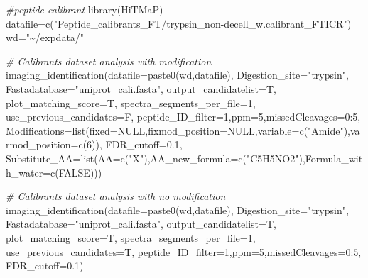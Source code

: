\documentclass[
]{article}
\newenvironment{Shaded}{\begin{snugshade}}{\end{snugshade}}
\newcommand{\AttributeTok}[1]{\textcolor[rgb]{0.77,0.63,0.00}{#1}}
\newcommand{\CommentTok}[1]{\textcolor[rgb]{0.56,0.35,0.01}{\textit{#1}}}
\newcommand{\ConstantTok}[1]{\textcolor[rgb]{0.00,0.00,0.00}{#1}}
\newcommand{\DecValTok}[1]{\textcolor[rgb]{0.00,0.00,0.81}{#1}}
\newcommand{\FloatTok}[1]{\textcolor[rgb]{0.00,0.00,0.81}{#1}}
\newcommand{\FunctionTok}[1]{\textcolor[rgb]{0.00,0.00,0.00}{#1}}
\newcommand{\NormalTok}[1]{#1}
\newcommand{\OtherTok}[1]{\textcolor[rgb]{0.56,0.35,0.01}{#1}}
\newcommand{\SpecialCharTok}[1]{\textcolor[rgb]{0.00,0.00,0.00}{#1}}
\newcommand{\StringTok}[1]{\textcolor[rgb]{0.31,0.60,0.02}{#1}}
\begin{document}
\begin{Shaded}
\begin{Highlighting}[]
\CommentTok{\#peptide calibrant}
\FunctionTok{library}\NormalTok{(HiTMaP)}
\NormalTok{datafile}\OtherTok{=}\FunctionTok{c}\NormalTok{(}\StringTok{"Peptide\_calibrants\_FT/trypsin\_non{-}decell\_w.calibrant\_FTICR"}\NormalTok{)}
\NormalTok{wd}\OtherTok{=}\StringTok{"\textasciitilde{}/expdata/"}

\CommentTok{\# Calibrants dataset analysis with modification}
\FunctionTok{imaging\_identification}\NormalTok{(}\AttributeTok{datafile=}\FunctionTok{paste0}\NormalTok{(wd,datafile),}
  \AttributeTok{Digestion\_site=}\StringTok{"trypsin"}\NormalTok{,}
  \AttributeTok{Fastadatabase=}\StringTok{"uniprot\_cali.fasta"}\NormalTok{,}
  \AttributeTok{output\_candidatelist=}\NormalTok{T,}
  \AttributeTok{plot\_matching\_score=}\NormalTok{T,}
  \AttributeTok{spectra\_segments\_per\_file=}\DecValTok{1}\NormalTok{,}
  \AttributeTok{use\_previous\_candidates=}\NormalTok{F,}
  \AttributeTok{peptide\_ID\_filter=}\DecValTok{1}\NormalTok{,}\AttributeTok{ppm=}\DecValTok{5}\NormalTok{,}\AttributeTok{missedCleavages=}\DecValTok{0}\SpecialCharTok{:}\DecValTok{5}\NormalTok{,}
  \AttributeTok{Modifications=}\FunctionTok{list}\NormalTok{(}\AttributeTok{fixed=}\ConstantTok{NULL}\NormalTok{,}\AttributeTok{fixmod\_position=}\ConstantTok{NULL}\NormalTok{,}\AttributeTok{variable=}\FunctionTok{c}\NormalTok{(}\StringTok{"Amide"}\NormalTok{),}\AttributeTok{varmod\_position=}\FunctionTok{c}\NormalTok{(}\DecValTok{6}\NormalTok{)),}
  \AttributeTok{FDR\_cutoff=}\FloatTok{0.1}\NormalTok{,}
  \AttributeTok{Substitute\_AA=}\FunctionTok{list}\NormalTok{(}\AttributeTok{AA=}\FunctionTok{c}\NormalTok{(}\StringTok{"X"}\NormalTok{),}\AttributeTok{AA\_new\_formula=}\FunctionTok{c}\NormalTok{(}\StringTok{"C5H5NO2"}\NormalTok{),}\AttributeTok{Formula\_with\_water=}\FunctionTok{c}\NormalTok{(}\ConstantTok{FALSE}\NormalTok{)))}

\CommentTok{\# Calibrants dataset analysis with no modification}
\FunctionTok{imaging\_identification}\NormalTok{(}\AttributeTok{datafile=}\FunctionTok{paste0}\NormalTok{(wd,datafile),}
  \AttributeTok{Digestion\_site=}\StringTok{"trypsin"}\NormalTok{,}
  \AttributeTok{Fastadatabase=}\StringTok{"uniprot\_cali.fasta"}\NormalTok{,}
  \AttributeTok{output\_candidatelist=}\NormalTok{T,}
  \AttributeTok{plot\_matching\_score=}\NormalTok{T,}
  \AttributeTok{spectra\_segments\_per\_file=}\DecValTok{1}\NormalTok{,}
  \AttributeTok{use\_previous\_candidates=}\NormalTok{T,}
  \AttributeTok{peptide\_ID\_filter=}\DecValTok{1}\NormalTok{,}\AttributeTok{ppm=}\DecValTok{5}\NormalTok{,}\AttributeTok{missedCleavages=}\DecValTok{0}\SpecialCharTok{:}\DecValTok{5}\NormalTok{,}
  \AttributeTok{FDR\_cutoff=}\FloatTok{0.1}\NormalTok{)}


\end{Highlighting}
\end{Shaded}
\end{document}
